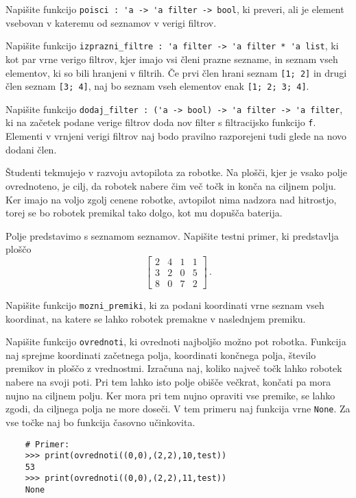 \documentclass[arhiv]{../izpit}
\begin{document}
\podnaloga
Napišite funkcijo \verb|poisci : 'a -> 'a filter -> bool|,
ki preveri, ali je element vsebovan v kateremu od seznamov v verigi filtrov.

\podnaloga
Napišite funkcijo \verb|izprazni_filtre : 'a filter -> 'a filter * 'a list|,
ki kot par vrne verigo filtrov, kjer imajo vsi členi prazne sezname, in seznam vseh
elementov, ki so bili hranjeni v filtrih. Če prvi člen hrani seznam \verb|[1; 2]|
in drugi člen seznam \verb|[3; 4]|, naj bo seznam vseh elementov enak \verb|[1; 2; 3; 4]|.

\podnaloga
Napišite funkcijo \verb|dodaj_filter : ('a -> bool) -> 'a filter -> 'a filter|,
ki na začetek podane verige filtrov doda nov filter s filtracijsko funkcijo \verb|f|.
Elementi v vrnjeni verigi filtrov naj bodo pravilno razporejeni tudi glede na novo dodani člen.

\naloga[]
Študenti tekmujejo v razvoju avtopilota za robotke. Na plošči, kjer je vsako polje ovrednoteno,
je cilj, da robotek nabere čim več točk in konča na ciljnem polju. Ker imajo na voljo
zgolj cenene robotke, avtopilot nima nadzora nad hitrostjo, torej se bo robotek premikal
tako dolgo, kot mu dopušča baterija.

\podnaloga
Polje predstavimo s seznamom seznamov. Napišite testni primer, ki predstavlja ploščo
\[
\begin{bmatrix}
    2 & 4 & 1 & 1 \\
    3 & 2 & 0 & 5 \\
    8 & 0 & 7 & 2
\end{bmatrix}\,.
\]

\podnaloga
Napišite funkcijo \verb|mozni_premiki|, ki za podani koordinati vrne seznam vseh
koordinat, na katere se lahko robotek premakne v naslednjem premiku.

\podnaloga
Napišite funkcijo \verb|ovrednoti|, ki ovrednoti najboljšo možno pot robotka.
Funkcija naj sprejme koordinati začetnega polja, koordinati končnega polja, število premikov
in ploščo z vrednostmi.
Izračuna naj, koliko največ točk lahko robotek nabere na svoji poti. Pri tem lahko
isto polje obišče večkrat, končati pa mora nujno na ciljnem polju. Ker mora pri tem
nujno opraviti vse premike, se lahko zgodi, da ciljnega polja ne more doseči.
V tem primeru naj funkcija vrne \verb|None|.
Za vse točke naj bo funkcija časovno učinkovita.

\begin{verbatim}
    # Primer:
    >>> print(ovrednoti((0,0),(2,2),10,test))
    53
    >>> print(ovrednoti((0,0),(2,2),11,test))
    None
\end{verbatim}
\end{document}
